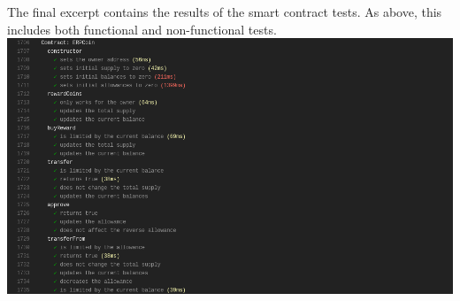 \documentclass{article}
\begin{document}
\newpage
\noindent The final excerpt contains the results of the smart contract tests. As above, this includes both functional and non-functional tests.\\
\includegraphics[scale=0.43]{contract-log.png}
\end{document}
